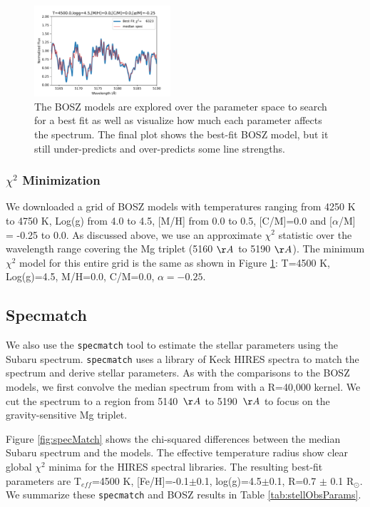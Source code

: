 \documentclass[preprint]{aastex61}
\begin{document}
\begin{figure}[!hbtp]
\begin{centering}
\includegraphics[width=0.45\textwidth]{images/bosz_model_exploration/FINAL_exploration.pdf}
\caption{The BOSZ models are explored over the parameter space to search for a best fit as well as visualize how much each parameter affects the spectrum.
The final plot shows the best-fit BOSZ model, but it still under-predicts and over-predicts some line strengths.}\label{fig:boszModelParamsMedianSpec}
\end{centering}
\end{figure}

\subsubsection{$\chi^2$ Minimization}
We downloaded a grid of BOSZ models with temperatures ranging from 4250 K to 4750 K, Log(g) from 4.0 to 4.5, [M/H] from 0.0 to 0.5, [C/M]=0.0 and [$\alpha$/M] = -0.25 to 0.0.
As discussed above, we use an approximate $\chi^2$ statistic over the wavelength range covering the Mg triplet (5160 $\AA$ to 5190 $\AA$).
The minimum $\chi^2$ model for this entire grid is the same as shown in Figure \ref{fig:boszModelParamsMedianSpec}: T=4500 K, Log(g)=4.5, M/H=0.0, C/M=0.0, $\alpha=-0.25$.


\subsection{Specmatch}\label{sec:SpecMatch}

We also use the \texttt{specmatch} tool \citep{yee2017specMatch} to estimate the stellar parameters using the Subaru spectrum.
\texttt{specmatch} uses a library of Keck HIRES spectra to match the spectrum and derive stellar parameters.
As with the comparisons to the BOSZ models, we first convolve the median spectrum from \citet{masuda2018rvKIC1255} with a R=40,000 kernel.
We cut the spectrum to a region from 5140~$\AA$ to 5190~$\AA$ to focus on the gravity-sensitive Mg triplet.

Figure \ref{fig:specMatch} shows the chi-squared differences between the median Subaru spectrum and the models.
The effective temperature radius show clear global $\chi^2$ minima for the HIRES spectral libraries.
The resulting best-fit parameters are T$_{eff}$=4500 K, [Fe/H]=-0.1$\pm$0.1, log(g)=4.5$\pm$0.1, R=0.7 $\pm$ 0.1 R$_\odot$.
We summarize these \texttt{specmatch} and BOSZ results in Table \ref{tab:stellObsParams}.
\end{document}
